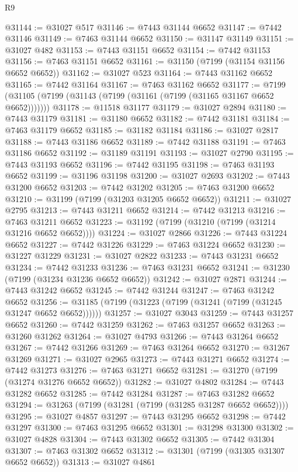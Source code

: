 \begin{lexlean}{R9}
\begin{coremodule}
@31144 := @31027 @517
@31146 := @7443 @31144 @6652
@31147 := @7442 @31146
@31149 := @7463 @31144 @6652
@31150 := @31147 @31149
@31151 := @31027 @482
@31153 := @7443 @31151 @6652
@31154 := @7442 @31153
@31156 := @7463 @31151 @6652
@31161 := @31150 (@7199 (@31154 @31156 @6652 @6652))
@31162 := @31027 @523
@31164 := @7443 @31162 @6652
@31165 := @7442 @31164
@31167 := @7463 @31162 @6652
@31177 := @7199 (@31105 (@7199 (@31143 (@7199 (@31161 (@7199 (@31165 @31167 @6652 @6652)))))))
@31178 := @11518 @31177
@31179 := @31027 @2894
@31180 := @7443 @31179
@31181 := @31180 @6652
@31182 := @7442 @31181
@31184 := @7463 @31179 @6652
@31185 := @31182 @31184
@31186 := @31027 @2817
@31188 := @7443 @31186 @6652
@31189 := @7442 @31188
@31191 := @7463 @31186 @6652
@31192 := @31189 @31191
@31193 := @31027 @2790
@31195 := @7443 @31193 @6652
@31196 := @7442 @31195
@31198 := @7463 @31193 @6652
@31199 := @31196 @31198
@31200 := @31027 @2693
@31202 := @7443 @31200 @6652
@31203 := @7442 @31202
@31205 := @7463 @31200 @6652
@31210 := @31199 (@7199 (@31203 @31205 @6652 @6652))
@31211 := @31027 @2795
@31213 := @7443 @31211 @6652
@31214 := @7442 @31213
@31216 := @7463 @31211 @6652
@31223 := @31192 (@7199 (@31210 (@7199 (@31214 @31216 @6652 @6652))))
@31224 := @31027 @2866
@31226 := @7443 @31224 @6652
@31227 := @7442 @31226
@31229 := @7463 @31224 @6652
@31230 := @31227 @31229
@31231 := @31027 @2822
@31233 := @7443 @31231 @6652
@31234 := @7442 @31233
@31236 := @7463 @31231 @6652
@31241 := @31230 (@7199 (@31234 @31236 @6652 @6652))
@31242 := @31027 @2871
@31244 := @7443 @31242 @6652
@31245 := @7442 @31244
@31247 := @7463 @31242 @6652
@31256 := @31185 (@7199 (@31223 (@7199 (@31241 (@7199 (@31245 @31247 @6652 @6652))))))
@31257 := @31027 @3043
@31259 := @7443 @31257 @6652
@31260 := @7442 @31259
@31262 := @7463 @31257 @6652
@31263 := @31260 @31262
@31264 := @31027 @4793
@31266 := @7443 @31264 @6652
@31267 := @7442 @31266
@31269 := @7463 @31264 @6652
@31270 := @31267 @31269
@31271 := @31027 @2965
@31273 := @7443 @31271 @6652
@31274 := @7442 @31273
@31276 := @7463 @31271 @6652
@31281 := @31270 (@7199 (@31274 @31276 @6652 @6652))
@31282 := @31027 @4802
@31284 := @7443 @31282 @6652
@31285 := @7442 @31284
@31287 := @7463 @31282 @6652
@31294 := @31263 (@7199 (@31281 (@7199 (@31285 @31287 @6652 @6652))))
@31295 := @31027 @4857
@31297 := @7443 @31295 @6652
@31298 := @7442 @31297
@31300 := @7463 @31295 @6652
@31301 := @31298 @31300
@31302 := @31027 @4828
@31304 := @7443 @31302 @6652
@31305 := @7442 @31304
@31307 := @7463 @31302 @6652
@31312 := @31301 (@7199 (@31305 @31307 @6652 @6652))
@31313 := @31027 @4861

\end{coremodule}
\end{lexlean}
